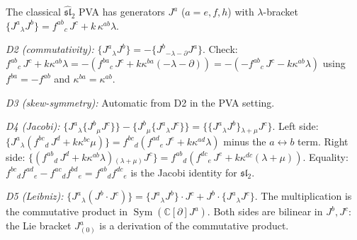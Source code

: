 \begin{computation}
\label{comp:pva-descent-sl2}
The classical $\widehat{\mathfrak{sl}}_2$ PVA has generators
$J^a$ ($a=e,f,h$) with $\lambda$-bracket
$\{J^a{}_\lambda J^b\}=f^{ab}{}_c\,J^c+k\,\kappa^{ab}\lambda$.

\emph{D2 (commutativity):}
$\{J^a{}_\lambda J^b\}=-\{J^b{}_{-\lambda-\partial} J^a\}$.
Check: $f^{ab}{}_c\,J^c+k\kappa^{ab}\lambda
=-(f^{ba}{}_c\,J^c+k\kappa^{ba}(-\lambda-\partial))
=-(-f^{ab}{}_c\,J^c-k\kappa^{ab}\lambda)$
using $f^{ba}=-f^{ab}$ and $\kappa^{ba}=\kappa^{ab}$. \checkmark

\emph{D3 (skew-symmetry):}
Automatic from D2 in the PVA setting. \checkmark

\emph{D4 (Jacobi):}
$\{J^a{}_\lambda\{J^b{}_\mu J^c\}\}
-\{J^b{}_\mu\{J^a{}_\lambda J^c\}\}
=\{\{J^a{}_\lambda J^b\}{}_{\lambda+\mu} J^c\}$.
Left side: $\{J^a{}_\lambda(f^{bc}{}_d\,J^d+k\kappa^{bc}\mu)\}
=f^{bc}{}_d(f^{ad}{}_e\,J^e+k\kappa^{ad}\lambda)$
minus the $a\leftrightarrow b$ term.
Right side:
$\{(f^{ab}{}_d\,J^d+k\kappa^{ab}\lambda){}_{(\lambda+\mu)} J^c\}
=f^{ab}{}_d(f^{dc}{}_e\,J^e+k\kappa^{dc}(\lambda+\mu))$.
Equality: $f^{bc}{}_d f^{ad}{}_e-f^{ac}{}_d f^{bd}{}_e
=f^{ab}{}_d f^{dc}{}_e$ is the Jacobi identity for
$\mathfrak{sl}_2$. \checkmark

\emph{D5 (Leibniz):}
$\{J^a{}_\lambda(J^b\cdot J^c)\}
=\{J^a{}_\lambda J^b\}\cdot J^c
+J^b\cdot\{J^a{}_\lambda J^c\}$.
The multiplication is the commutative product in
$\operatorname{Sym}(\mathbb C[\partial]J^a)$.
Both sides are bilinear in $J^b,J^c$: the Lie bracket
$J^a_{(0)}$ is a derivation of the commutative product. \checkmark
\end{computation}

